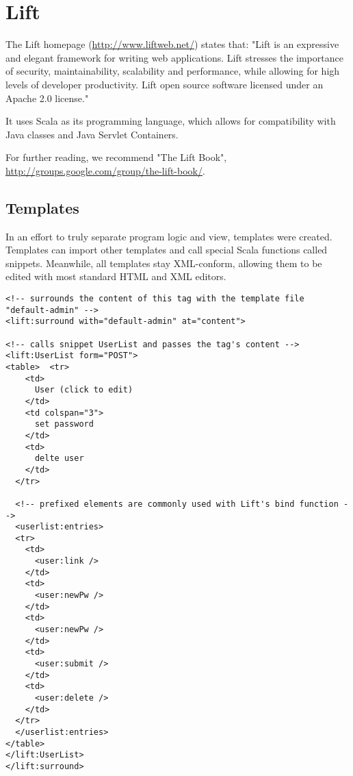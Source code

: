 \section{Lift}

The Lift homepage (\url{http://www.liftweb.net/}) states that:
"Lift is an expressive and elegant framework for writing web applications. Lift stresses the importance of security, maintainability, scalability and performance, while allowing for high levels of developer productivity. Lift open source software licensed under an Apache 2.0 license."

It uses Scala as its programming language, which allows for compatibility with Java classes and Java Servlet Containers.

For further reading, we recommend "The Lift Book", \url{http://groups.google.com/group/the-lift-book/}.


\subsection{Templates}

In an effort to truly separate program logic and view, templates were created. Templates can import other templates and call special Scala functions called snippets. Meanwhile, all templates stay XML-conform, allowing them to be edited with most standard HTML and XML editors.

\begin{lstlisting}[caption=Lift Templates: userlist.html,label=lst:lift:templates]
<!-- surrounds the content of this tag with the template file "default-admin" -->
<lift:surround with="default-admin" at="content">

<!-- calls snippet UserList and passes the tag's content -->
<lift:UserList form="POST">
<table>  <tr>
    <td>
      User (click to edit)
    </td>
    <td colspan="3">
      set password
    </td>
    <td>
      delte user
    </td>
  </tr>

  <!-- prefixed elements are commonly used with Lift's bind function -->
  <userlist:entries>
  <tr>
    <td>
      <user:link />
    </td>
    <td>
      <user:newPw />
    </td>
    <td>
      <user:newPw />
    </td>
    <td>
      <user:submit />
    </td>
    <td>
      <user:delete />
    </td>
  </tr>
  </userlist:entries>
</table>
</lift:UserList>
</lift:surround>
\end{lstlisting}


